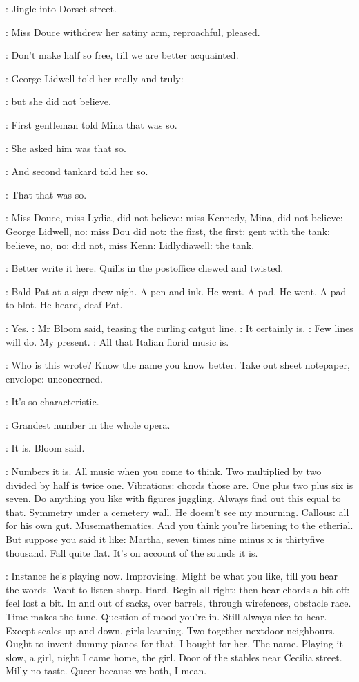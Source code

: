 :
Jingle into Dorset street.

:
Miss Douce withdrew her satiny arm,
reproachful,
pleased.

\MissD:
Don't make half so free,
till we are better acquainted.

:
George Lidwell told her really and truly:

:
but she did not believe.

:
First gentleman told Mina that was so.

:
She asked him was that so.

:
And second tankard told her so.

:
That that was so.

:
Miss Douce,
miss Lydia,
did not believe:
miss Kennedy,
Mina,
did not
believe:
George Lidwell,
no:
miss Dou did not:
the first,
the first:
gent
with the tank:
believe,
no,
no:
did not,
miss Kenn:
Lidlydiawell:
the
tank.

\BloomInt:
Better write it here.
Quills in the postoffice chewed and twisted.

:
Bald Pat at a sign drew nigh.
A pen and ink.
He went.
A pad.
He
went.
A pad to blot.
He heard,
deaf Pat.

\Bloom:
Yes.
:
Mr Bloom said,
teasing the curling catgut line.
\Bloom:
It certainly is.
\BloomInt:
Few lines will do.
My present.
\Bloom:
All that Italian florid music is.

\BloomInt:
Who is this wrote?
Know the name you know better.
Take out sheet notepaper,
envelope:
unconcerned.

\Bloom:
It's so characteristic.

\goulding:
Grandest number in the whole opera.

\Bloom:
It is.
\sout{Bloom said.}

\BloomInt:
Numbers it is.
All music when you come to think.
Two multiplied by two
divided by half is twice one.
Vibrations:
chords those are.
One plus two
plus six is seven.
Do anything you like with figures juggling.
Always find
out this equal to that.
Symmetry under a cemetery wall.
He doesn't see my
mourning.
Callous:
all for his own gut.
Musemathematics.
And you think
you're listening to the etherial.
But suppose you said it like:
Martha,
seven times nine minus x is thirtyfive thousand.
Fall quite flat.
It's on
account of the sounds it is.

\BloomInt:
Instance he's playing now.
Improvising.
Might be what you like,
till
you hear the words.
Want to listen sharp.
Hard.
Begin all right:
then hear
chords a bit off:
feel lost a bit.
In and out of sacks,
over barrels,
through wirefences,
obstacle race.
Time makes the tune.
Question of mood
you're in.
Still always nice to hear.
Except scales up and down,
girls
learning.
Two together nextdoor neighbours.
Ought to invent dummy pianos
for that.
I bought for her.
The name.
Playing it slow,
a girl,
night I came home,
the girl.
Door of the stables near Cecilia street.
Milly no taste.
Queer because we both,
I mean.


